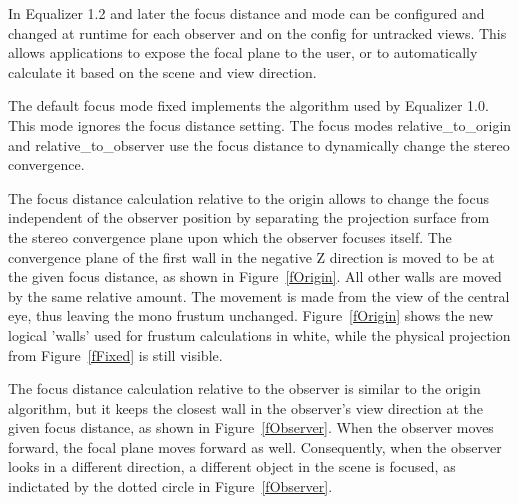 \documentclass[10pt,a4]{scrartcl}
\newcommand{\fig}[1]{Figure~\ref{#1}}
\begin{document}
In Equalizer 1.2 and later the focus distance and mode can be configured and
changed at runtime for each \textsf{observer} and on the \textsf{config} for
untracked views. This allows applications to expose the focal plane to the user,
or to automatically calculate it based on the scene and view direction.

The default focus mode \textsf{fixed} implements the algorithm used by Equalizer
1.0. This mode ignores the focus distance setting. The focus modes
\textsf{relative\_to\_origin} and \textsf{relative\_to\_observer} use the focus
distance to dynamically change the stereo convergence.

The focus distance calculation relative to the origin allows to change the
focus independent of the observer position by separating the projection surface
from the stereo convergence plane upon which the observer focuses itself. The
convergence plane of the first wall in the negative Z direction is moved to be
at the given focus distance, as shown in \fig{fOrigin}. All other walls are
moved by the same relative amount. The movement is made from the view of the
central eye, thus leaving the mono frustum unchanged. \fig{fOrigin} shows the
new logical 'walls' used for frustum calculations in white, while the physical
projection from \fig{fFixed} is still visible.

The focus distance calculation relative to the observer is similar to the origin
algorithm, but it keeps the closest wall in the observer's view direction at the
given focus distance, as shown in \fig{fObserver}. When the observer moves
forward, the focal plane moves forward as well. Consequently, when the observer
looks in a different direction, a different object in the scene is focused, as
indictated by the dotted circle in \fig{fObserver}.
\end{document}
